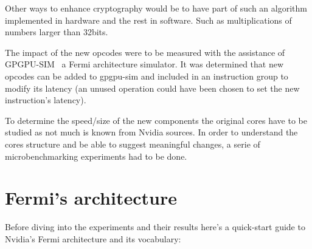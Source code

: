\documentclass{report}
\begin{document}
    Other ways to enhance cryptography would be to have part of such
    an algorithm implemented in hardware and the rest in software.
    Such as multiplications of numbers larger than 32bits.
    

    The impact of the new opcodes were to be measured with the assistance of
    GPGPU-SIM~\cite{gpgpusim09} a Fermi architecture simulator. It was determined
    that new opcodes can be added to gpgpu-sim and included in an instruction group
    to modify its latency (an unused operation could have been chosen to set the new
    instruction's latency).

    To determine the speed/size of the new components the original cores have to
    be studied as not much is known from Nvidia sources. In order to understand 
    the cores structure and be able to suggest meaningful changes, a serie of microbenchmarking 
    experiments had to be done. 


\chapter{Fermi's architecture}
    Before diving into the experiments and their results here's a quick-start
    guide to Nvidia's Fermi architecture and its vocabulary:
\end{document}
